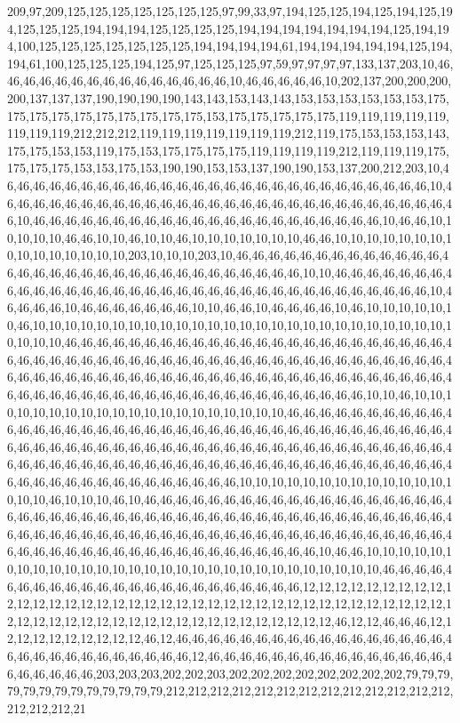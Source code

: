 209,97,209,125,125,125,125,125,125,125,97,99,33,97,194,125,125,194,125,194,125,194,125,125,125,194,194,194,125,125,125,125,194,194,194,194,194,194,194,125,194,194,100,125,125,125,125,125,125,125,194,194,194,194,61,194,194,194,194,194,125,194,194,61,100,125,125,125,194,125,97,125,125,125,97,59,97,97,97,97,133,137,203,10,46,46,46,46,46,46,46,46,46,46,46,46,46,46,46,10,46,46,46,46,46,10,202,137,200,200,200,200,137,137,137,190,190,190,190,143,143,153,143,143,153,153,153,153,153,153,175,175,175,175,175,175,175,175,175,175,153,175,175,175,175,175,119,119,119,119,119,119,119,119,212,212,212,119,119,119,119,119,119,119,212,119,175,153,153,153,143,175,175,153,153,119,175,153,175,175,175,175,119,119,119,119,212,119,119,119,175,175,175,175,153,153,175,153,190,190,153,153,137,190,190,153,137,200,212,203,10,46,46,46,46,46,46,46,46,46,46,46,46,46,46,46,46,46,46,46,46,46,46,46,46,46,46,46,10,46,46,46,46,46,46,46,46,46,46,46,46,46,46,46,46,46,46,46,46,46,46,46,46,46,46,46,46,46,10,46,46,46,46,46,46,46,46,46,46,46,46,46,46,46,46,46,46,46,46,46,46,10,46,46,10,10,10,10,10,46,46,10,10,46,10,10,46,10,10,10,10,10,10,10,46,46,10,10,10,10,10,10,10,10,10,10,10,10,10,10,10,203,10,10,10,203,10,46,46,46,46,46,46,46,46,46,46,46,46,46,46,46,46,46,46,46,46,46,46,46,46,46,46,46,46,46,46,46,46,10,10,46,46,46,46,46,46,46,46,46,46,46,46,46,46,46,46,46,46,46,46,46,46,46,46,46,46,46,46,46,46,46,46,46,46,10,46,46,46,46,10,46,46,46,46,46,46,46,10,10,46,46,10,46,46,46,46,10,46,10,10,10,10,10,10,46,10,10,10,10,10,10,10,10,10,10,10,10,10,10,10,10,10,10,10,10,10,10,10,10,10,10,10,10,10,10,46,46,46,46,46,46,46,46,46,46,46,46,46,46,46,46,46,46,46,46,46,46,46,46,46,46,46,46,46,46,46,46,46,46,46,46,46,46,46,46,46,46,46,46,46,46,46,46,46,46,46,46,46,46,46,46,46,46,46,46,46,46,46,46,46,46,46,46,46,46,46,46,46,46,46,46,46,46,46,46,46,46,46,46,46,46,46,46,46,46,46,46,46,46,46,46,46,46,46,46,46,46,46,10,10,46,10,10,10,10,10,10,10,10,10,10,10,10,10,10,10,10,10,10,10,10,46,46,46,46,46,46,46,46,46,46,46,46,46,46,46,46,46,46,46,46,46,46,46,46,46,46,46,46,46,46,46,46,46,46,46,46,46,46,46,46,46,46,46,46,46,46,46,46,46,46,46,46,46,46,46,46,46,46,46,46,46,46,46,46,46,46,46,46,46,46,46,46,46,46,46,46,46,46,46,46,46,46,46,46,46,46,46,46,46,46,46,46,46,46,46,46,46,46,46,46,46,46,46,46,46,46,46,46,46,10,10,10,10,10,10,10,10,10,10,10,10,10,10,10,10,46,10,10,10,46,10,46,46,46,46,46,46,46,46,46,46,46,46,46,46,46,46,46,46,46,46,46,46,46,46,46,46,46,46,46,46,46,46,46,46,46,46,46,46,46,46,46,46,46,46,46,46,46,46,46,46,46,46,46,46,46,46,46,46,46,46,46,46,46,46,46,46,46,46,46,46,46,46,46,46,46,46,46,46,46,46,46,46,46,46,46,46,46,46,46,46,46,46,46,46,46,10,46,46,10,10,10,10,10,10,10,10,10,10,10,10,10,10,10,10,10,10,10,10,10,10,10,10,10,10,10,10,10,46,46,46,46,46,46,46,46,46,46,46,46,46,46,46,46,46,46,46,46,46,46,46,12,12,12,12,12,12,12,12,12,12,12,12,12,12,12,12,12,12,12,12,12,12,12,12,12,12,12,12,12,12,12,12,12,12,12,12,12,12,12,12,12,12,12,12,12,12,12,12,12,12,12,12,12,12,12,12,12,12,46,12,12,46,46,46,12,12,12,12,12,12,12,12,12,12,46,12,46,46,46,46,46,46,46,46,46,46,46,46,46,46,46,46,46,46,46,46,46,46,46,46,46,46,46,46,46,12,46,46,46,46,46,46,46,46,46,46,46,46,46,46,46,46,46,46,46,46,46,203,203,203,202,202,203,202,202,202,202,202,202,202,202,79,79,79,79,79,79,79,79,79,79,79,79,79,212,212,212,212,212,212,212,212,212,212,212,212,212,212,212,212,21